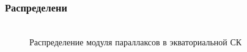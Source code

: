\documentclass[12pt,aspectratio=43]{beamer}
\begin{document}
\begin{frame}[<alignment>]
\frametitle{Распределени}
\begin{figure}[h!]
\\{Распределение модуля параллаксов в экваториальной СК }
\label{img:sf_ra}
\end{figure}
\end{frame}	
\end{document}
